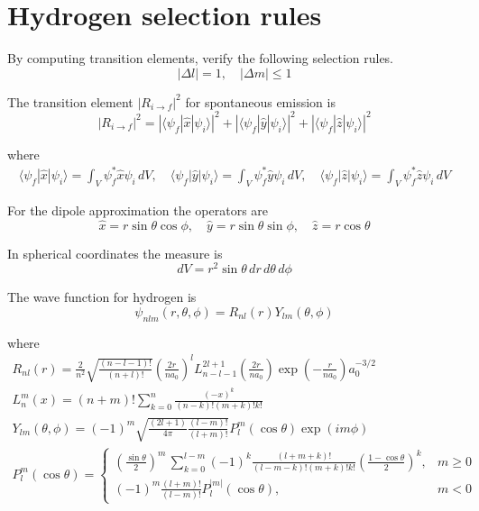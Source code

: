 

\section*{Hydrogen selection rules}

By computing transition elements, verify the following selection rules.
\begin{equation*}
|\Delta l|=1,\quad|\Delta m|\le1
\end{equation*}

The transition element $|R_{i\rightarrow f}|^2$ for spontaneous emission is
\begin{equation*}
|R_{i\rightarrow f}|^2
=|\langle\psi_f|\hat x|\psi_i\rangle|^2
+|\langle\psi_f|\hat y|\psi_i\rangle|^2
+|\langle\psi_f|\hat z|\psi_i\rangle|^2
\end{equation*}

where
\begin{gather*}
\langle\psi_f|\hat x|\psi_i\rangle
=\int_V\psi_f^*\hat x\psi_i\,dV,
\quad
\langle\psi_f|\hat y|\psi_i\rangle
=\int_V\psi_f^*\hat y\psi_i\,dV,
\quad
\langle\psi_f|\hat z|\psi_i\rangle
=\int_V\psi_f^*\hat z\psi_i\,dV
\end{gather*}

For the dipole approximation the operators are
\begin{equation*}
\hat x=r\sin\theta\cos\phi,
\quad
\hat y=r\sin\theta\sin\phi,
\quad
\hat z=r\cos\theta
\end{equation*}

In spherical coordinates the measure is
\begin{equation*}
dV=r^2\sin\theta\,dr\,d\theta\,d\phi
\end{equation*}

The wave function for hydrogen is
\begin{equation*}
\psi_{nlm}(r,\theta,\phi)=R_{nl}(r)Y_{lm}(\theta,\phi)
\end{equation*}

where
\begin{gather*}
R_{nl}(r)=
\frac{2}{n^2}
\sqrt{\frac{(n-l-1)!}{(n+l)!}}
\left(\frac{2r}{na_0}\right)^l
L_{n-l-1}^{2l+1}\left(\frac{2r}{na_0}\right)
\exp\left(-\frac{r}{na_0}\right)
a_0^{-3/2}
\\[1ex]
L_n^m(x)=(n+m)!\sum_{k=0}^n\frac{(-x)^k}{(n-k)!(m+k)!k!}
\\[1ex]
Y_{lm}(\theta,\phi)=(-1)^m
\sqrt{\frac{(2l+1)}{4\pi}
\frac{(l-m)!}{(l+m)!}}
P_l^m(\cos\theta)\exp(im\phi)
\\[1ex]
P_l^m(\cos\theta)=\begin{cases}
\displaystyle
\left(\frac{\sin\theta}{2}\right)^m\,\sum_{k=0}^{l-m}
(-1)^k\frac{(l+m+k)!}{(l-m-k)!(m+k)!k!}
\left(\frac{1-\cos\theta}{2}\right)^k, & m\ge0
\\[3ex]
\displaystyle
(-1)^m\frac{(l+m)!}{(l-m)!}P_l^{|m|}(\cos\theta), & m<0
\end{cases}
\end{gather*}


